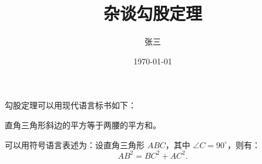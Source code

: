 \documentclass{ctexart}%
\title{\heiti 杂谈勾股定理}
\author{\kaishu 张三}
\date{\today}
\newcommand\degree{^\circ}
\begin{document}
	\maketitle
	
	勾股定理可以用现代语言标书如下：
	
	直角三角形斜边的平方等于两腰的平方和。
	
	可以用符号语言表述为：设直角三角形 $ABC$，其中 $\angle C=90\degree$，则有：
	\begin{equation}
		AB^2 = BC^2 + AC^2.
	\end{equation}
\end{document}

